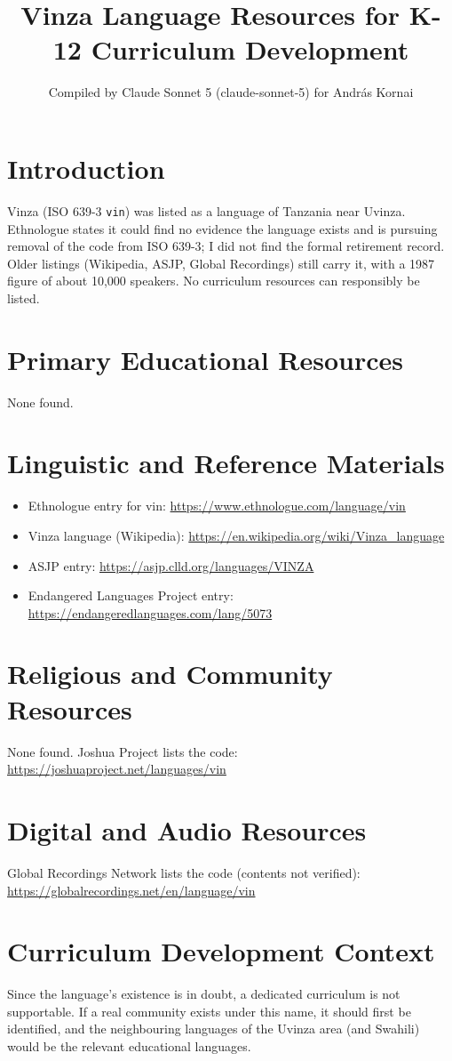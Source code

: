 \documentclass[12pt]{article}
\title{Vinza Language Resources for K-12 Curriculum Development}
\author{Compiled by Claude Sonnet 5 (claude-sonnet-5) for Andr\'as Kornai}
\date{}
\begin{document}
\maketitle

\section{Introduction}
Vinza (ISO 639-3 \texttt{vin}) was listed as a language of Tanzania near Uvinza. Ethnologue states it could find no evidence the language exists and is pursuing removal of the code from ISO 639-3; I did not find the formal retirement record. Older listings (Wikipedia, ASJP, Global Recordings) still carry it, with a 1987 figure of about 10,000 speakers. No curriculum resources can responsibly be listed.

\section{Primary Educational Resources}
None found.

\section{Linguistic and Reference Materials}
\begin{itemize}
\item Ethnologue entry for vin: \url{https://www.ethnologue.com/language/vin}
\item Vinza language (Wikipedia): \url{https://en.wikipedia.org/wiki/Vinza_language}
\item ASJP entry: \url{https://asjp.clld.org/languages/VINZA}
\item Endangered Languages Project entry: \url{https://endangeredlanguages.com/lang/5073}
\end{itemize}

\section{Religious and Community Resources}
None found. Joshua Project lists the code: \url{https://joshuaproject.net/languages/vin}

\section{Digital and Audio Resources}
Global Recordings Network lists the code (contents not verified): \url{https://globalrecordings.net/en/language/vin}

\section{Curriculum Development Context}
Since the language's existence is in doubt, a dedicated curriculum is not supportable. If a real community exists under this name, it should first be identified, and the neighbouring languages of the Uvinza area (and Swahili) would be the relevant educational languages.
\end{document}

